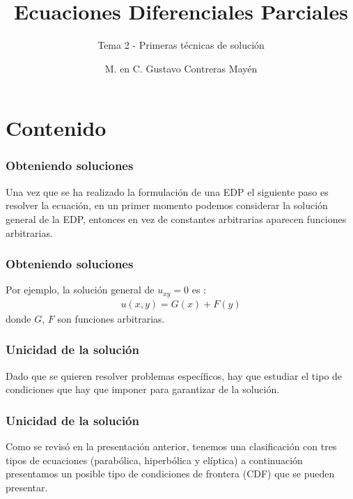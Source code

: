 \documentclass[12pt]{beamer}
\title{\large{Ecuaciones Diferenciales Parciales}}
\subtitle{Tema 2 - Primeras técnicas de solución}
\author{M. en C. Gustavo Contreras Mayén}
\date{}
\begin{document}
\maketitle
\fontsize{14}{14}\selectfont
{}

\section*{Contenido}


\begin{frame}
\frametitle{Obteniendo soluciones}
Una vez que se ha realizado la formulación de una EDP el siguiente paso es resolver la ecuación, en un primer momento podemos considerar la solución general de la EDP, entonces en vez de constantes arbitrarias aparecen funciones arbitrarias.
\end{frame}
\begin{frame}
\frametitle{Obteniendo soluciones}
Por ejemplo, la solución general de $u_{xy} = 0$ es :
\pause
\begin{align*}
u (x, y) = G (x) + F (y)
\end{align*}
donde $G$, $F$ son funciones arbitrarias.
\end{frame}

\begin{frame}
\frametitle{Unicidad de la solución}
Dado que se quieren resolver problemas específicos, hay que estudiar el tipo de condiciones que hay que imponer para garantizar  de la solución.
\end{frame}
\begin{frame}
\frametitle{Unicidad de la solución}
Como se revisó en la presentación anterior, tenemos una clasificación con tres tipos de ecuaciones (parabólica, hiperbólica y elíptica) a continuación presentamos un posible tipo de condiciones de frontera (CDF) que se pueden presentar.
\end{frame}
\end{document}
